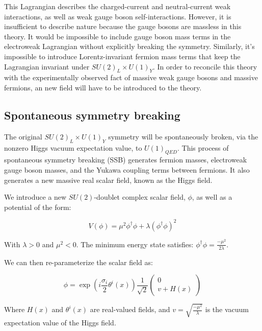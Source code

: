 This Lagrangian describes the charged-current and neutral-current weak interactions, as well as weak gauge boson self-interactions.
However, it is insufficient to describe nature because the gauge bosons are massless in this theory.
It would be impossible to include gauge boson mass terms in the electroweak Lagrangian without explicitly breaking the symmetry.
Similarly, it's impossible to introduce Lorentz-invariant fermion mass terms that keep the Lagrangian invariant under $SU(2)_L \times U(1)_Y$.
In order to reconcile this theory with the experimentally observed fact of massive weak gauge bosons and massive fermions,
an new field will have to be introduced to the theory.

\subsection{Spontaneous symmetry breaking}\label{subsec:ew_higgs}

The original $SU(2)_{L}\times U(1)_Y$ symmetry will be spontaneously broken, via the nonzero Higgs vacuum expectation value, to $U(1)_{QED}$.
This process of spontaneous symmetry breaking (SSB) generates fermion masses, electroweak gauge boson masses,
and the Yukawa coupling terms between fermions.
It also generates a new massive real scalar field, known as the Higgs field.

We introduce a new $SU(2)$-doublet complex scalar field, $\phi$, as well as a potential of the form:

\begin{equation}\label{eq:higgs_potential}
    V(\phi) = \mu^2 \phi^\dagger\phi + \lambda(\phi^\dagger\phi)^2
\end{equation}

With $\lambda > 0$ and $\mu^2 <0$.
The minimum energy state satisfies: $\phi^\dagger\phi = \frac{-\mu^2}{2\lambda}$.

We can then re-parameterize the scalar field as:

\begin{equation}\label{eq:higgs_param}
    \phi = \exp{\left(i\frac{\sigma_i}{2}\theta^i(x)\right)}\frac{1}{\sqrt{2}}\begin{pmatrix} 0 \\ v+H(x) \end{pmatrix}
\end{equation}

Where $H(x)$ and $\theta^i(x)$ are real-valued fields,
and $v = \sqrt{\frac{-\mu^2}{\lambda}}$ is the vacuum expectation value of the Higgs field.

